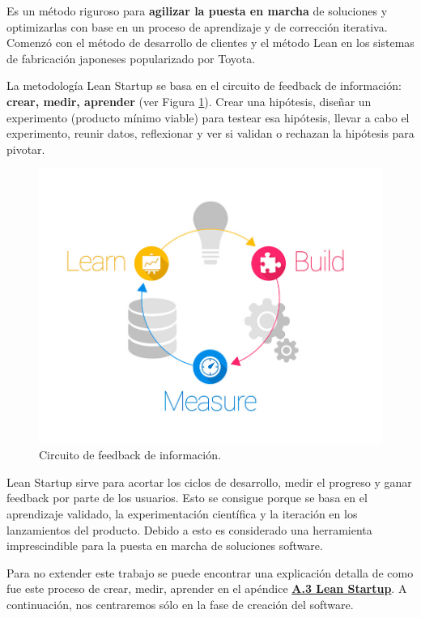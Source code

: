 \documentclass[12pt,twoside,titlepage]{report}
\begin{document}
Es un método riguroso para \textbf{agilizar la puesta en marcha} de soluciones y optimizarlas con base en un proceso de aprendizaje y de corrección iterativa. Comenzó con el método de desarrollo de clientes y el método Lean en los sistemas de fabricación japoneses popularizado por Toyota.

La metodología Lean Startup se basa en el circuito de feedback de información: \textbf{crear, medir, aprender} (ver Figura \ref{fig:LeanStartup}). Crear una hipótesis, diseñar un experimento (producto mínimo viable) para testear esa hipótesis, llevar a cabo el experimento, reunir datos, reflexionar y ver si validan o rechazan la hipótesis para pivotar.
\cite{leanstartup1}

\begin{figure}[H]
    \centering
    \includegraphics[scale=0.3]{Lean Startup/CircuitoFeedback}
    \caption{Circuito de feedback de información.}
    \label{fig:LeanStartup}
\end{figure}

Lean Startup sirve para acortar los ciclos de desarrollo, medir el progreso y ganar feedback por parte de los usuarios. Esto se consigue porque se basa en el aprendizaje validado, la experimentación científica y la iteración en los lanzamientos del producto. 
Debido a esto es considerado una herramienta imprescindible para la puesta en marcha de soluciones software. 

Para no extender este trabajo se puede encontrar una explicación detalla de como fue este proceso de crear, medir, aprender en el apéndice \hyperref[sec:LeanStartup]{\textbf{A.3 Lean Startup}}. A continuación, nos centraremos sólo en la fase de creación del software.
\cite{leanstartup2}
\end{document}
